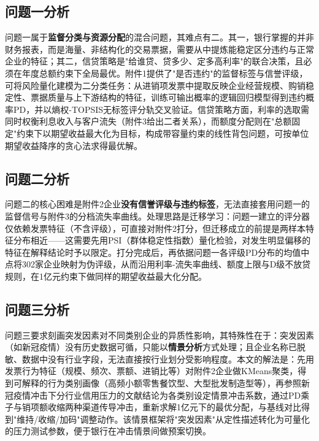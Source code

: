 \documentclass[12pt, a4paper]{article}
\begin{document}
\subsection{问题一分析}

问题一属于\textbf{监督分类与资源分配}的混合问题，其难点有二。其一，银行掌握的并非财务报表，而是海量、非结构化的交易票据，需要从中提炼能稳定区分违约与正常企业的特征；其二，信贷策略是"给谁贷、贷多少、定多高利率"的联合决策，且必须在年度总额约束下全局最优。附件1提供了"是否违约"的监督标签与信誉评级，可将风险量化建模为二分类任务：从进销项发票中提取反映企业经营规模、购销稳定性、票据质量与上下游结构的特征，训练可输出概率的逻辑回归模型得到违约概率PD，并以熵权-TOPSIS无标签评分轨交叉验证。信贷策略方面，利率的选取需同时权衡利息收入与客户流失（附件3给出二者关系），而额度分配则在"总额固定"约束下以期望收益最大化为目标，构成带容量约束的线性背包问题，可按单位期望收益降序的贪心法求得最优解。

\subsection{问题二分析}

问题二的核心困难是附件2企业\textbf{没有信誉评级与违约标签}，无法直接套用问题一的监督信号与附件3的分档流失率曲线。处理思路是迁移学习：问题一建立的评分器仅依赖发票特征（不含评级），可直接对附件2打分，但迁移成立的前提是两样本特征分布相近——这需要先用PSI（群体稳定性指数）量化检验，对发生明显偏移的特征在解释结论时予以限定。打分完成后，再依据问题一各评级PD分布的均值中点将302家企业映射为伪评级，从而沿用利率-流失率曲线、额度上限与D级不放贷规则，在1亿元约束下做同样的期望收益最大化分配。

\subsection{问题三分析}

问题三要求刻画突发因素对不同类别企业的异质性影响，其特殊性在于：突发因素（如新冠疫情）没有历史数据可循，只能以\textbf{情景分析}方式处理；且企业名称已脱敏、数据中没有行业字段，无法直接按行业划分受影响程度。本文的解法是：先用发票行为特征（规模、频次、票额、进销比等）对附件2企业做KMeans聚类，得到可解释的行为类别画像（高频小额零售餐饮型、大型批发制造型等），再参照新冠疫情冲击下分行业信用压力的文献结论为各类别设定情景冲击系数，通过PD乘子与销项额收缩两种渠道传导冲击，重新求解1亿元下的最优分配，与基线对比得到"维持/收缩/加码"调整动作。该情景框架将"突发因素"从定性描述转化为可量化的压力测试参数，便于银行在冲击情景间做预案切换。

\end{document}
